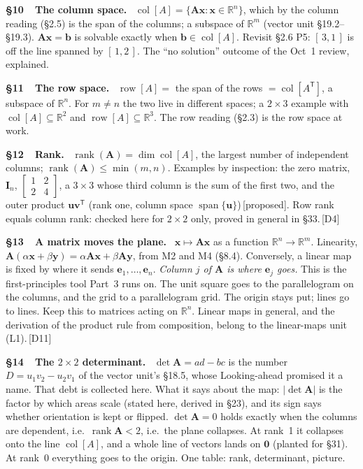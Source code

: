 \documentclass[11pt]{article}
\newcommand{\R}{\mathbb{R}}
\newcommand{\vc}[1]{\mathbf{#1}}
\newcommand{\mt}[1]{\mathbf{#1}}
\newcommand{\T}{^{\mathsf{T}}}
\newcommand{\colsp}[1]{\operatorname{col}[#1]}
\newcommand{\rowsp}[1]{\operatorname{row}[#1]}
\DeclareMathOperator{\rank}{rank}
\DeclareMathOperator{\spanop}{span}
\newcommand{\prop}{\,{\color{ForestGreen}\sffamily\scriptsize[proposed]}}
\newcommand{\see}[1]{\,{\color{BrickRed}\sffamily\scriptsize[#1]}}
\newcommand{\sect}[2]{\par\smallskip\noindent\textbf{\S#1\ \ #2.}\ \ignorespaces}
\begin{document}
\sect{10}{The column space} $\colsp{A}=\{\mt{A}\vc{x}:\vc{x}\in\R^{n}\}$, which
by the column reading (\S2.5) is the span of the columns; a subspace of
$\R^{m}$ (vector unit \S19.2--\S19.3). $\mt{A}\vc{x}=\vc{b}$ is solvable exactly
when $\vc{b}\in\colsp{A}$. Revisit \S2.6 P5: $[\,3,1\,]$ is off the line
spanned by $[\,1,2\,]$. The ``no solution'' outcome of the Oct~1 review,
explained.

\sect{11}{The row space} $\rowsp{A}=$ the span of the rows $=\colsp{A\T}$, a
subspace of $\R^{n}$. For $m\neq n$ the two live in different spaces; a
$2\times3$ example with $\colsp{A}\subseteq\R^{2}$ and
$\rowsp{A}\subseteq\R^{3}$. The row reading (\S2.3) is the row space at work.

\sect{12}{Rank} $\rank(\mt{A})=\dim\colsp{A}$, the largest number of
independent columns; $\rank(\mt{A})\le\min(m,n)$. Examples by inspection: the
zero matrix, $\mt{I}_n$, $\begin{bmatrix}1&2\\2&4\end{bmatrix}$, a $3\times3$
whose third column is the sum of the first two, and the outer product
$\vc{u}\vc{v}\T$ (rank one, column space $\spanop\{\vc{u}\}$)\prop. Row rank equals column
rank: checked here for $2\times2$ only, proved in general in \S33.\see{D4}

\sect{13}{A matrix moves the plane} $\vc{x}\mapsto\mt{A}\vc{x}$ as a function
$\R^{n}\to\R^{m}$. Linearity,
$\mt{A}(\alpha\vc{x}+\beta\vc{y})=\alpha\mt{A}\vc{x}+\beta\mt{A}\vc{y}$, from
M2 and M4 (\S8.4). Conversely, a linear map is fixed by where it sends
$\vc{e}_1,\dots,\vc{e}_n$. \emph{Column $j$ of $\mt{A}$ is where $\vc{e}_j$
goes.} This is the first-principles tool Part~3 runs on. The unit square goes
to the parallelogram on the columns, and the grid to a parallelogram grid. The
origin stays put; lines go to lines. Keep this to matrices acting on
$\R^{n}$. Linear maps in general, and the derivation of the product rule from
composition, belong to the linear-maps unit (L1).\see{D11}

\sect{14}{The $2\times2$ determinant} $\det\mt{A}=ad-bc$ is the number
$D=u_1v_2-u_2v_1$ of the vector unit's \S18.5, whose Looking-ahead promised it a
name. That debt is collected here. What it says about the map:
$|\det\mt{A}|$ is the factor by which areas scale (stated here, derived in
\S23), and its sign says whether orientation is kept or flipped.
$\det\mt{A}=0$ holds exactly when the columns are dependent, i.e.\
$\rank\mt{A}<2$, i.e.\ the plane collapses. At rank~1 it collapses onto the line
$\colsp{A}$, and a whole line of vectors lands on $\vc{0}$ (planted for \S31). At
rank~0 everything goes to the origin. One table: rank, determinant, picture.
\end{document}
